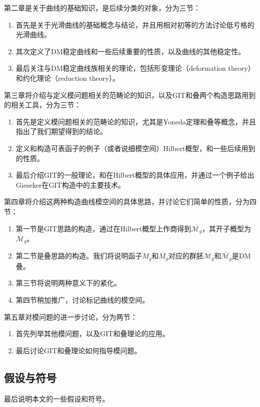 第二章是关于曲线的基础知识，是后续分类的对象，分为三节：
\begin{enumerate}
	\item 首先是关于光滑曲线的基础概念与结论，并且用相对初等的方法讨论低亏格的光滑曲线。
	\item 其次定义了DM稳定曲线和一些后续重要的性质，以及曲线的其他稳定性。
	\item 最后关注与DM稳定曲线族相关的理论，包括形变理论（deformation theory）和约化理论（reduction theory）。
\end{enumerate}

第三章将介绍与定义模问题相关的范畴论的知识，以及GIT和叠两个构造思路用到的相关工具，分为三节：
\begin{enumerate}
	\item 首先是定义模问题相关的范畴论的知识，尤其是Yoneda定理和叠等概念，并且指出了我们期望得到的结论。
	\item 定义和构造可表函子的例子（或者说细模空间）Hilbert概型，和一些后续用到的性质。
	\item 最后介绍GIT的一般理论，和在Hilbert概型的具体应用，并通过一个例子给出Gieseker在GIT构造中的主要技术。
\end{enumerate}

第四章将介绍这两种构造曲线模空间的具体思路，并讨论它们简单的性质，分为四节：
\begin{enumerate} 	
	\item 第一节是GIT思路的构造，通过在Hilbert概型上作商得到$ \overline{\mathcal{M}_g} $，其开子概型为$ \mathcal{M}_g $。
	\item 第二节是叠思路的构造。我们将说明函子$ M_g $和$ \overline{M_g} $对应的群胚$ \mathscr{M}_g $和$ \overline{\mathscr{M}_g} $是DM叠。
	\item 第三节将说明两种意义下的紧化。
	\item 第四节稍加推广，讨论标记曲线的模空间。
\end{enumerate}	

第五章对模问题的进一步讨论，分为两节：
\begin{enumerate}
	\item 首先列举其他模问题，以及GIT和叠理论的应用。
	\item 最后讨论GIT和叠理论如何指导模问题。
\end{enumerate}

\subsection{假设与符号}
最后说明本文的一些假设和符号。

